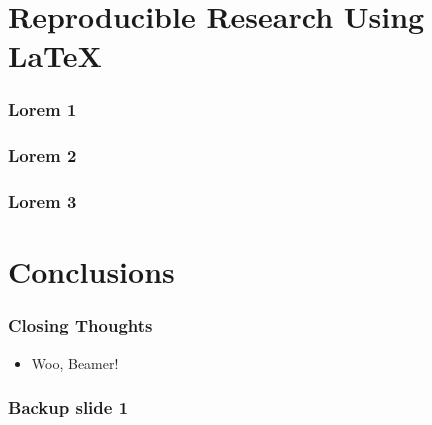 \documentclass{beamer}
\begin{document}
	\section{Reproducible Research Using \LaTeX}
		\begin{frame}
			\frametitle{Lorem 1}
			\blindtext
		\end{frame}

		\begin{frame}
			\frametitle{Lorem 2}
			\blindtext
		\end{frame}

		\begin{frame}
			\frametitle{Lorem 3}
			\blindtext
		\end{frame}

	\section{Conclusions}
		\begin{frame}
			\frametitle{Closing Thoughts}
			\begin{itemize}
				\item Woo, Beamer!
			\end{itemize}
		\end{frame}
	
	\appendix
	\backupbegin
	  \begin{frame}
	    \frametitle{Backup slide 1}
	    \blindtext
	  \end{frame}
	\backupend
\end{document}
